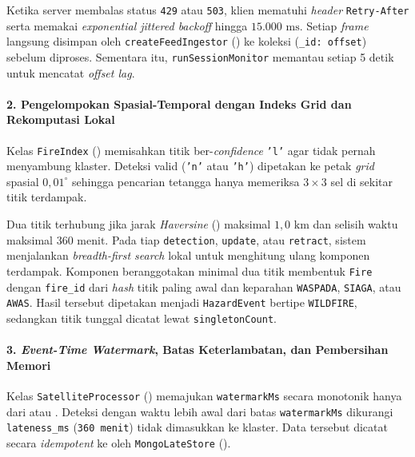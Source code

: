 Ketika server membalas status \texttt{429} atau \texttt{503}, klien mematuhi \textit{header} \texttt{Retry-After} serta memakai \textit{exponential jittered backoff} hingga $15.000\text{ ms}$. Setiap \textit{frame} langsung disimpan oleh \texttt{createFeedIngestor} () ke koleksi  (\texttt{\_id: offset}) sebelum diproses. Sementara itu, \texttt{runSessionMonitor} memantau  setiap 5 detik untuk mencatat \textit{offset lag}.

\paragraph*{2. Pengelompokan Spasial-Temporal dengan Indeks Grid dan Rekomputasi Lokal}
Kelas \texttt{FireIndex} () memisahkan titik ber-\textit{confidence} \texttt{'l'} agar tidak pernah menyambung klaster. Deteksi valid (\texttt{'n'} atau \texttt{'h'}) dipetakan ke petak \textit{grid} spasial $0{,}01^\circ$ sehingga pencarian tetangga hanya memeriksa $3 \times 3$ sel di sekitar titik terdampak.

Dua titik terhubung jika jarak \textit{Haversine} () maksimal $1{,}0\text{ km}$ dan selisih waktu maksimal $360\text{ menit}$. Pada tiap \texttt{detection}, \texttt{update}, atau \texttt{retract}, sistem menjalankan \textit{breadth-first search} lokal untuk menghitung ulang komponen terdampak. Komponen beranggotakan minimal dua titik membentuk \texttt{Fire} dengan \texttt{fire\_id} dari \textit{hash} titik paling awal dan keparahan \texttt{WASPADA}, \texttt{SIAGA}, atau \texttt{AWAS}. Hasil tersebut dipetakan menjadi \texttt{HazardEvent} bertipe \texttt{WILDFIRE}, sedangkan titik tunggal dicatat lewat \texttt{singletonCount}.

\paragraph*{3. \textit{Event-Time Watermark}, Batas Keterlambatan, dan Pembersihan Memori}
Kelas \texttt{Satellite\allowbreak Processor} () memajukan \texttt{watermarkMs} secara monotonik hanya dari  atau . Deteksi dengan waktu lebih awal dari batas \texttt{watermarkMs} dikurangi \texttt{lateness\_ms} (\texttt{360 menit}) tidak dimasukkan ke klaster. Data tersebut dicatat secara \textit{idempotent} ke  oleh \texttt{MongoLateStore} ().

